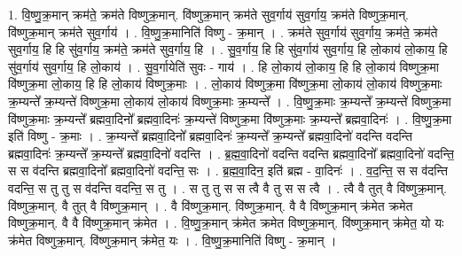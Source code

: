 \documentclass[17pt]{extarticle}
\begin{document}
1. वि॒ष्णु॒क्र॒मान् क्रम॑ते॒ क्रम॑ते विष्णुक्र॒मान्. वि॑ष्णुक्र॒मान् क्रम॑ते सुव॒र्गाय॑ सुव॒र्गाय॒ क्रम॑ते विष्णुक्र॒मान्. वि॑ष्णुक्र॒मान् क्रम॑ते सुव॒र्गाय॑ । . वि॒ष्णु॒क्र॒मानिति॑ विष्णु - क्र॒मान् । . क्रम॑ते सुव॒र्गाय॑ सुव॒र्गाय॒ क्रम॑ते॒ क्रम॑ते सुव॒र्गाय॒ हि हि सु॑व॒र्गाय॒ क्रम॑ते॒ क्रम॑ते सुव॒र्गाय॒ हि । . सु॒व॒र्गाय॒ हि हि सु॑व॒र्गाय॑ सुव॒र्गाय॒ हि लो॒काय॑ लो॒काय॒ हि सु॑व॒र्गाय॑ सुव॒र्गाय॒ हि लो॒काय॑ । . सु॒व॒र्गायेति॑ सुवः - गाय॑ । . हि लो॒काय॑ लो॒काय॒ हि हि लो॒काय॑ विष्णुक्र॒मा वि॑ष्णुक्र॒मा लो॒काय॒ हि हि लो॒काय॑ विष्णुक्र॒माः । . लो॒काय॑ विष्णुक्र॒मा वि॑ष्णुक्र॒मा लो॒काय॑ लो॒काय॑ विष्णुक्र॒माः क्र॒म्यन्ते᳚ क्र॒म्यन्ते॑ विष्णुक्र॒मा लो॒काय॑ लो॒काय॑ विष्णुक्र॒माः क्र॒म्यन्ते᳚ । . वि॒ष्णु॒क्र॒माः क्र॒म्यन्ते᳚ क्र॒म्यन्ते॑ विष्णुक्र॒मा वि॑ष्णुक्र॒माः क्र॒म्यन्ते᳚ ब्रह्मवा॒दिनो᳚ ब्रह्मवा॒दिनः॑ क्र॒म्यन्ते॑ विष्णुक्र॒मा वि॑ष्णुक्र॒माः क्र॒म्यन्ते᳚ ब्रह्मवा॒दिनः॑ । . वि॒ष्णु॒क्र॒मा इति॑ विष्णु - क्र॒माः । . क्र॒म्यन्ते᳚ ब्रह्मवा॒दिनो᳚ ब्रह्मवा॒दिनः॑ क्र॒म्यन्ते᳚ क्र॒म्यन्ते᳚ ब्रह्मवा॒दिनो॑ वदन्ति वदन्ति ब्रह्मवा॒दिनः॑ क्र॒म्यन्ते᳚ क्र॒म्यन्ते᳚ ब्रह्मवा॒दिनो॑ वदन्ति । . ब्र॒ह्म॒वा॒दिनो॑ वदन्ति वदन्ति ब्रह्मवा॒दिनो᳚ ब्रह्मवा॒दिनो॑ वदन्ति॒ स स व॑दन्ति ब्रह्मवा॒दिनो᳚ ब्रह्मवा॒दिनो॑ वदन्ति॒ सः । . ब्र॒ह्म॒वा॒दिन॒ इति॑ ब्रह्म - वा॒दिनः॑ । . व॒द॒न्ति॒ स स व॑दन्ति वदन्ति॒ स तु तु स व॑दन्ति वदन्ति॒ स तु । . स तु तु स स त्वै वै तु स स त्वै । . त्वै वै तुत् वै वि॑ष्णुक्र॒मान्. वि॑ष्णुक्र॒मान्. वै तुत् वै वि॑ष्णुक्र॒मान् । . वै वि॑ष्णुक्र॒मान्. वि॑ष्णुक्र॒मान्. वै वै वि॑ष्णुक्र॒मान् क्र॑मेत क्रमेत विष्णुक्र॒मान्. वै वै वि॑ष्णुक्र॒मान् क्र॑मेत । . वि॒ष्णु॒क्र॒मान् क्र॑मेत क्रमेत विष्णुक्र॒मान्. वि॑ष्णुक्र॒मान् क्र॑मेत॒ यो यः क्र॑मेत विष्णुक्र॒मान्. वि॑ष्णुक्र॒मान् क्र॑मेत॒ यः । . वि॒ष्णु॒क्र॒मानिति॑ विष्णु - क्र॒मान् । \newline
\end{document}
